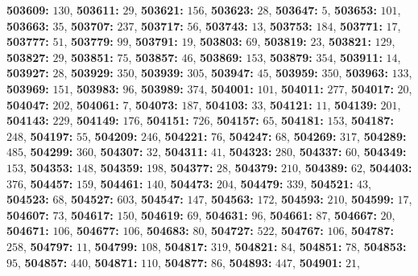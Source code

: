 \textsf{\bfseries 503609:} $130$, \textsf{\bfseries 503611:} $29$, \textsf{\bfseries 503621:} $156$, \textsf{\bfseries 503623:} $28$, \textsf{\bfseries 503647:} $5$, \textsf{\bfseries 503653:} $101$, \textsf{\bfseries 503663:} $35$, \textsf{\bfseries 503707:} $237$, \textsf{\bfseries 503717:} $56$, \textsf{\bfseries 503743:} $13$, \textsf{\bfseries 503753:} $184$, \textsf{\bfseries 503771:} $17$, \textsf{\bfseries 503777:} $51$, \textsf{\bfseries 503779:} $99$, \textsf{\bfseries 503791:} $19$, \textsf{\bfseries 503803:} $69$, \textsf{\bfseries 503819:} $23$, \textsf{\bfseries 503821:} $129$, \textsf{\bfseries 503827:} $29$, \textsf{\bfseries 503851:} $75$, \textsf{\bfseries 503857:} $46$, \textsf{\bfseries 503869:} $153$, \textsf{\bfseries 503879:} $354$, \textsf{\bfseries 503911:} $14$, \textsf{\bfseries 503927:} $28$, \textsf{\bfseries 503929:} $350$, \textsf{\bfseries 503939:} $305$, \textsf{\bfseries 503947:} $45$, \textsf{\bfseries 503959:} $350$, \textsf{\bfseries 503963:} $133$, \textsf{\bfseries 503969:} $151$, \textsf{\bfseries 503983:} $96$, \textsf{\bfseries 503989:} $374$, \textsf{\bfseries 504001:} $101$, \textsf{\bfseries 504011:} $277$, \textsf{\bfseries 504017:} $20$, \textsf{\bfseries 504047:} $202$, \textsf{\bfseries 504061:} $7$, \textsf{\bfseries 504073:} $187$, \textsf{\bfseries 504103:} $33$, \textsf{\bfseries 504121:} $11$, \textsf{\bfseries 504139:} $201$, \textsf{\bfseries 504143:} $229$, \textsf{\bfseries 504149:} $176$, \textsf{\bfseries 504151:} $726$, \textsf{\bfseries 504157:} $65$, \textsf{\bfseries 504181:} $153$, \textsf{\bfseries 504187:} $248$, \textsf{\bfseries 504197:} $55$, \textsf{\bfseries 504209:} $246$, \textsf{\bfseries 504221:} $76$, \textsf{\bfseries 504247:} $68$, \textsf{\bfseries 504269:} $317$, \textsf{\bfseries 504289:} $485$, \textsf{\bfseries 504299:} $360$, \textsf{\bfseries 504307:} $32$, \textsf{\bfseries 504311:} $41$, \textsf{\bfseries 504323:} $280$, \textsf{\bfseries 504337:} $60$, \textsf{\bfseries 504349:} $153$, \textsf{\bfseries 504353:} $148$, \textsf{\bfseries 504359:} $198$, \textsf{\bfseries 504377:} $28$, \textsf{\bfseries 504379:} $210$, \textsf{\bfseries 504389:} $62$, \textsf{\bfseries 504403:} $376$, \textsf{\bfseries 504457:} $159$, \textsf{\bfseries 504461:} $140$, \textsf{\bfseries 504473:} $204$, \textsf{\bfseries 504479:} $339$, \textsf{\bfseries 504521:} $43$, \textsf{\bfseries 504523:} $68$, \textsf{\bfseries 504527:} $603$, \textsf{\bfseries 504547:} $147$, \textsf{\bfseries 504563:} $172$, \textsf{\bfseries 504593:} $210$, \textsf{\bfseries 504599:} $17$, \textsf{\bfseries 504607:} $73$, \textsf{\bfseries 504617:} $150$, \textsf{\bfseries 504619:} $69$, \textsf{\bfseries 504631:} $96$, \textsf{\bfseries 504661:} $87$, \textsf{\bfseries 504667:} $20$, \textsf{\bfseries 504671:} $106$, \textsf{\bfseries 504677:} $106$, \textsf{\bfseries 504683:} $80$, \textsf{\bfseries 504727:} $522$, \textsf{\bfseries 504767:} $106$, \textsf{\bfseries 504787:} $258$, \textsf{\bfseries 504797:} $11$, \textsf{\bfseries 504799:} $108$, \textsf{\bfseries 504817:} $319$, \textsf{\bfseries 504821:} $84$, \textsf{\bfseries 504851:} $78$, \textsf{\bfseries 504853:} $95$, \textsf{\bfseries 504857:} $440$, \textsf{\bfseries 504871:} $110$, \textsf{\bfseries 504877:} $86$, \textsf{\bfseries 504893:} $447$, \textsf{\bfseries 504901:} $21$, 
